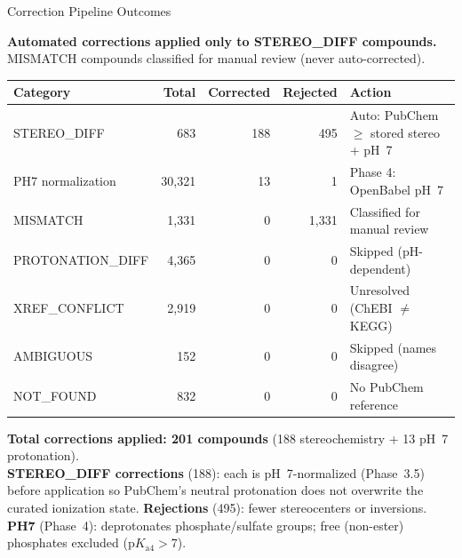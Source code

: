 \documentclass[aspectratio=169,11pt]{beamer}
\begin{document}
\begin{frame}{Correction Pipeline Outcomes}

\textbf{Automated corrections applied only to STEREO\_DIFF compounds.}
MISMATCH compounds classified for manual review (never auto-corrected).

\smallskip
\begin{table}[h]
\centering
\footnotesize
\begin{tabular}{lrrrl}
\toprule
\textbf{Category} & \textbf{Total} & \textbf{Corrected} & \textbf{Rejected} & \textbf{Action} \\
\midrule
STEREO\_DIFF       &    683 & 188 &  495 & Auto: PubChem $\geq$ stored stereo + pH~7 \\
PH7 normalization  & 30,321 &  13 &    1 & Phase 4: OpenBabel pH~7 \\
MISMATCH           &  1,331 &   0 & 1,331 & Classified for manual review \\
PROTONATION\_DIFF  &  4,365 &   0 &    0 & Skipped (pH-dependent) \\
XREF\_CONFLICT     &  2,919 &   0 &    0 & Unresolved (ChEBI $\neq$ KEGG) \\
AMBIGUOUS          &    152 &   0 &    0 & Skipped (names disagree) \\
NOT\_FOUND         &    832 &   0 &    0 & No PubChem reference \\
\bottomrule
\end{tabular}
\end{table}

\smallskip
\footnotesize
\textbf{Total corrections applied: 201 compounds}
(188 stereochemistry + 13 pH~7 protonation).\\[2pt]
\textbf{STEREO\_DIFF corrections} (188): each is pH~7-normalized (Phase~3.5)
before application so PubChem's neutral protonation does not overwrite
the curated ionization state.
\textbf{Rejections} (495): fewer stereocenters or inversions.\\[2pt]
\textbf{PH7} (Phase~4): deprotonates phosphate/sulfate groups;
free (non-ester) phosphates excluded ($\text{p}K_{\text{a}4} > 7$).

\end{frame}
\end{document}
